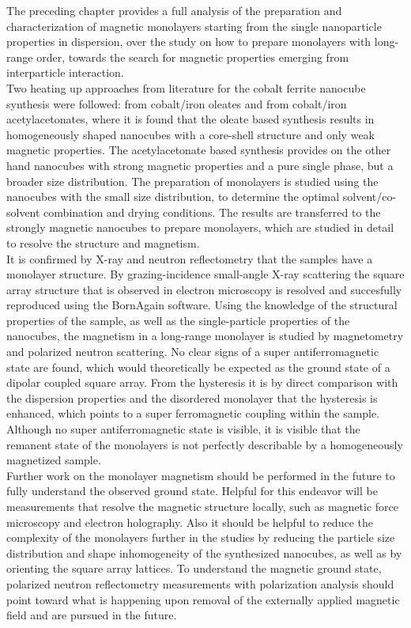 \documentclass[\main/dresen_thesis.tex]{subfiles}
\begin{document}
  The preceding chapter provides a full analysis of the preparation and characterization of magnetic monolayers starting from the single nanoparticle properties in dispersion, over the study on how to prepare monolayers with long-range order, towards the search for magnetic properties emerging from interparticle interaction.
  \\

  Two heating up approaches from literature for the cobalt ferrite nanocube synthesis were followed: from cobalt/iron oleates and from cobalt/iron acetylacetonates, where it is found that the oleate based synthesis results in homogeneously shaped nanocubes with a core-shell structure and only weak magnetic properties.
  The acetylacetonate based synthesis provides on the other hand nanocubes with strong magnetic properties and a pure single phase, but a broader size distribution.
  The preparation of monolayers is studied using the nanocubes with the small size distribution, to determine the optimal solvent/co-solvent combination and drying conditions.
  The results are transferred to the strongly magnetic nanocubes to prepare monolayers, which are studied in detail to resolve the structure and magnetism.
  \\

  It is confirmed by X-ray and neutron reflectometry that the samples have a monolayer structure.
  By grazing-incidence small-angle X-ray scattering the square array structure that is observed in electron microscopy is resolved and succesfully reproduced using the BornAgain software.
  Using the knowledge of the structural properties of the sample, as well as the single-particle properties of the nanocubes, the magnetism in a long-range monolayer is studied by magnetometry and polarized neutron scattering.
  No clear signs of a super antiferromagnetic state are found, which would theoretically be expected as the ground state of a dipolar coupled square array.
  From the hysteresis it is by direct comparison with the dispersion properties and the disordered monolayer that the hysteresis is enhanced, which points to a super ferromagnetic coupling within the sample.
  Although no super antiferromagnetic state is visible, it is visible that the remanent state of the monolayers is not perfectly describable by a homogeneously magnetized sample.
  \\

  Further work on the monolayer magnetism should be performed in the future to fully understand the observed ground state.
  Helpful for this endeavor will be measurements that resolve the magnetic structure locally, such as magnetic force microscopy and electron holography.
  Also it should be helpful to reduce the complexity of the monolayers further in the studies by reducing the particle size distribution and shape inhomogeneity of the synthesized nanocubes, as well as by orienting the square array lattices.
  To understand the magnetic ground state, polarized neutron reflectometry measurements with polarization analysis should point toward what is happening upon removal of the externally applied magnetic field and are pursued in the future.
\end{document}
